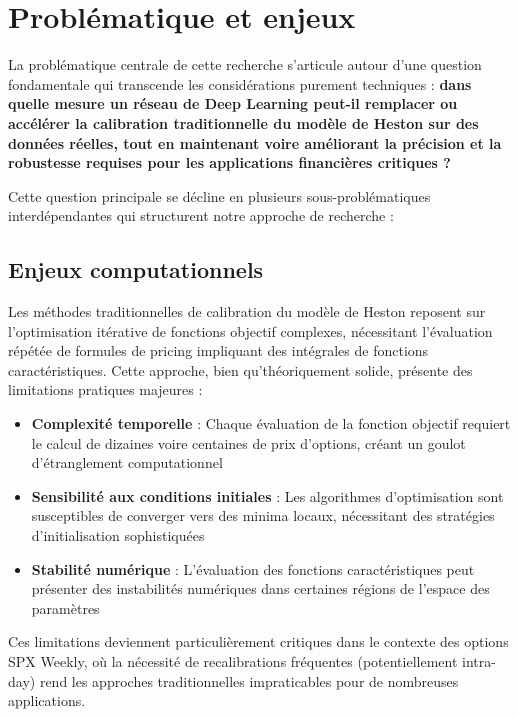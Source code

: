 \section{Problématique et enjeux}

La problématique centrale de cette recherche s'articule autour d'une question fondamentale qui transcende les considérations purement techniques : \textbf{dans quelle mesure un réseau de Deep Learning peut-il remplacer ou accélérer la calibration traditionnelle du modèle de Heston sur des données réelles, tout en maintenant voire améliorant la précision et la robustesse requises pour les applications financières critiques ?}

Cette question principale se décline en plusieurs sous-problématiques interdépendantes qui structurent notre approche de recherche :

\subsection{Enjeux computationnels}

Les méthodes traditionnelles de calibration du modèle de Heston reposent sur l'optimisation itérative de fonctions objectif complexes, nécessitant l'évaluation répétée de formules de pricing impliquant des intégrales de fonctions caractéristiques. Cette approche, bien qu'théoriquement solide, présente des limitations pratiques majeures :

\begin{itemize}
\item \textbf{Complexité temporelle} : Chaque évaluation de la fonction objectif requiert le calcul de dizaines voire centaines de prix d'options, créant un goulot d'étranglement computationnel
\item \textbf{Sensibilité aux conditions initiales} : Les algorithmes d'optimisation sont susceptibles de converger vers des minima locaux, nécessitant des stratégies d'initialisation sophistiquées
\item \textbf{Stabilité numérique} : L'évaluation des fonctions caractéristiques peut présenter des instabilités numériques dans certaines régions de l'espace des paramètres
\end{itemize}

Ces limitations deviennent particulièrement critiques dans le contexte des options SPX Weekly, où la nécessité de recalibrations fréquentes (potentiellement intra-day) rend les approches traditionnelles impraticables pour de nombreuses applications.

